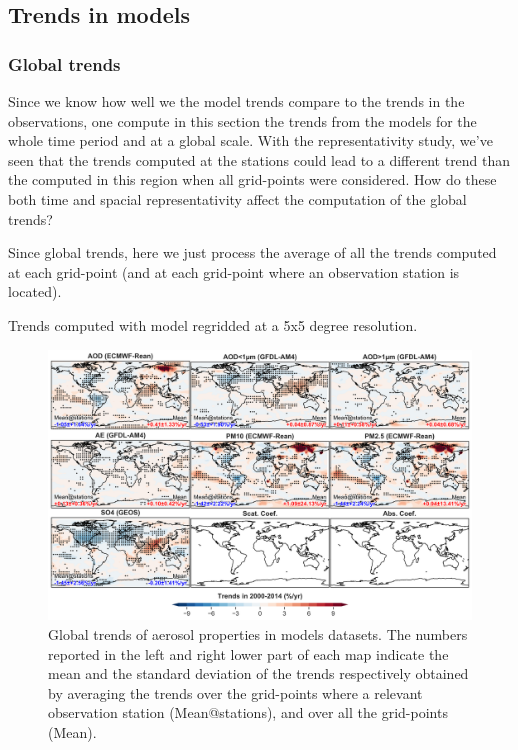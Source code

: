 \documentclass[journal abbreviation, manuscript]{copernicus}
\begin{document}
\subsection{Trends in models}

\subsubsection{Global trends}

Since we know how well we the model trends compare to the trends in the observations, one compute in this section the trends from the models for the whole time period and at a global scale. With the representativity study, we've seen that the trends computed at the stations could lead to a different trend than the computed in this region when all grid-points were considered. How do these both time and spacial representativity affect the computation of the global trends?

Since global trends, here we just process the average of all the trends computed at each grid-point (and at each grid-point where an observation station is located).

Trends computed with model regridded at a 5x5 degree resolution.

\begin{figure}
 \includegraphics[width=\columnwidth]{../scripts/figs/trends_map.png}
 \caption{Global trends of aerosol properties in models datasets. The numbers reported in the left and right lower part of each map indicate the mean and the standard deviation of the trends respectively obtained by averaging the trends over the grid-points where a relevant observation station (Mean@stations), and over all the grid-points (Mean).}
 \label{mod_trends}
\end{figure}
\end{document}
